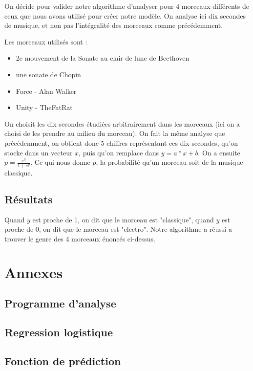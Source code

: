 \documentclass[a4paper]{article}
\begin{document}
On décide pour valider notre algorithme d'analyser pour 4 morceaux différents de ceux que nous avons utilisé pour créer notre modèle. On analyse ici dix secondes de musique, et non pas l'intégralité des morceaux comme précédemment.

Les morceaux utilisés sont :

\begin{itemize}

\item 2e mouvement de la Sonate au clair de lune de Beethoven
\item une sonate de Chopin
\item Force - Alan Walker
\item Unity - TheFatRat

\end{itemize}

On choisit les dix secondes étudiées arbitrairement dans les morceaux (ici on a choisi de les prendre au milieu du morceau). On fait la même analyse que précédemment, on obtient donc 5 chiffres représentant ces dix secondes, qu'on stocke dans un vecteur $x$, puis qu'on remplace dans $ y = a*x + b$. On a ensuite $p = \frac{e^{y}}{1+e^{y}}$. Ce qui nous donne $p$, la probabilité qu'un morceau soit de la musique classique. 

\subsection{Résultats}

Quand $y$ est proche de 1, on dit que le morceau est "classique", quand $y$ est proche de 0, on dit que le morceau est "electro". Notre algorithme a réussi a trouver le genre des 4 morceaux énoncés ci-dessus.

\newpage

\section{Annexes}
\subsection{Programme d'analyse}


\subsection{Regression logistique}


\subsection{Fonction de prédiction}

\end{document}
